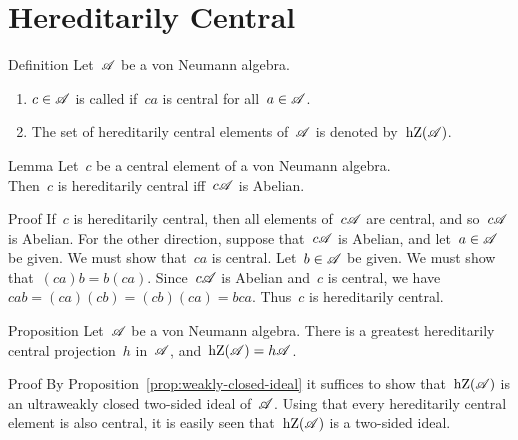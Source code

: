 \documentclass[a]{subfiles}
\begin{document}
\section{Hereditarily Central}
\begin{parsec}%
\begin{point}{Definition}%
Let~$\mathscr{A}$ be a von Neumann algebra.
\begin{enumerate}
\item
$c\in \mathscr{A}$
is called 
if~$ca$ is central for all~$a\in\mathscr{A}$.
\item
The set of hereditarily central elements of~$\mathscr{A}$
is denoted by~$\operatorname{hZ}(\mathscr{A})$.
\end{enumerate}
\end{point}
\begin{point}{Lemma}%
Let~$c$ be a central element of a von Neumann algebra.\\
Then~$c$ is hereditarily central
iff~$c\mathscr{A}$ is Abelian.
\begin{point}{Proof}%
If~$c$ is hereditarily central,
then all elements of~$c\mathscr{A}$
are central,
and so~$c\mathscr{A}$ is Abelian.
For the other direction,
suppose that~$c\mathscr{A}$ is Abelian,
and let~$a\in\mathscr{A}$ be given.
We must show that~$ca$ is central.
Let~$b\in\mathscr{A}$ be given.
We must show that~$(ca)b=b(ca)$.
Since~$c\mathscr{A}$ is Abelian
and~$c$ is central,
we have $cab=(ca)(cb)=(cb)(ca)=bca$.
Thus~$c$ is hereditarily central.
\end{point}
\end{point}
\begin{point}{Proposition}%
Let~$\mathscr{A}$ be a von Neumann algebra.
There is a greatest hereditarily central projection~$h$ in~$\mathscr{A}$,
and~$\operatorname{hZ}(\mathscr{A})=h\mathscr{A}$.
\begin{point}{Proof}%
By Proposition~\ref{prop:weakly-closed-ideal} it suffices
to show that~$\operatorname{hZ}(\mathscr{A})$ is an ultraweakly closed
two-sided ideal of~$\mathscr{A}$.
Using that every hereditarily central
element is also central, it is easily seen
 that~$\operatorname{hZ}(\mathscr{A})$ is a two-sided ideal.


\end{point}
\end{point}
\end{parsec}
\end{document}
